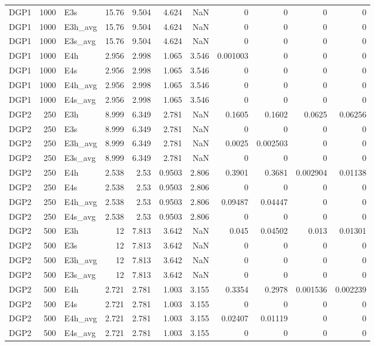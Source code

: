 \begin{table}[!htbp]
\begin{tabular}{lrlrrrrrrrr}
DGP1 & 1000 & E3s & 15.76 & 9.504 & 4.624 & NaN & 0 & 0 & 0 & 0 \\
DGP1 & 1000 & E3h_avg & 15.76 & 9.504 & 4.624 & NaN & 0 & 0 & 0 & 0 \\
DGP1 & 1000 & E3s_avg & 15.76 & 9.504 & 4.624 & NaN & 0 & 0 & 0 & 0 \\
DGP1 & 1000 & E4h & 2.956 & 2.998 & 1.065 & 3.546 & 0.001003 & 0 & 0 & 0 \\
DGP1 & 1000 & E4s & 2.956 & 2.998 & 1.065 & 3.546 & 0 & 0 & 0 & 0 \\
DGP1 & 1000 & E4h_avg & 2.956 & 2.998 & 1.065 & 3.546 & 0 & 0 & 0 & 0 \\
DGP1 & 1000 & E4s_avg & 2.956 & 2.998 & 1.065 & 3.546 & 0 & 0 & 0 & 0 \\
DGP2 & 250 & E3h & 8.999 & 6.349 & 2.781 & NaN & 0.1605 & 0.1602 & 0.0625 & 0.06256 \\
DGP2 & 250 & E3s & 8.999 & 6.349 & 2.781 & NaN & 0 & 0 & 0 & 0 \\
DGP2 & 250 & E3h_avg & 8.999 & 6.349 & 2.781 & NaN & 0.0025 & 0.002503 & 0 & 0 \\
DGP2 & 250 & E3s_avg & 8.999 & 6.349 & 2.781 & NaN & 0 & 0 & 0 & 0 \\
DGP2 & 250 & E4h & 2.538 & 2.53 & 0.9503 & 2.806 & 0.3901 & 0.3681 & 0.002904 & 0.01138 \\
DGP2 & 250 & E4s & 2.538 & 2.53 & 0.9503 & 2.806 & 0 & 0 & 0 & 0 \\
DGP2 & 250 & E4h_avg & 2.538 & 2.53 & 0.9503 & 2.806 & 0.09487 & 0.04447 & 0 & 0 \\
DGP2 & 250 & E4s_avg & 2.538 & 2.53 & 0.9503 & 2.806 & 0 & 0 & 0 & 0 \\
DGP2 & 500 & E3h & 12 & 7.813 & 3.642 & NaN & 0.045 & 0.04502 & 0.013 & 0.01301 \\
DGP2 & 500 & E3s & 12 & 7.813 & 3.642 & NaN & 0 & 0 & 0 & 0 \\
DGP2 & 500 & E3h_avg & 12 & 7.813 & 3.642 & NaN & 0 & 0 & 0 & 0 \\
DGP2 & 500 & E3s_avg & 12 & 7.813 & 3.642 & NaN & 0 & 0 & 0 & 0 \\
DGP2 & 500 & E4h & 2.721 & 2.781 & 1.003 & 3.155 & 0.3354 & 0.2978 & 0.001536 & 0.002239 \\
DGP2 & 500 & E4s & 2.721 & 2.781 & 1.003 & 3.155 & 0 & 0 & 0 & 0 \\
DGP2 & 500 & E4h_avg & 2.721 & 2.781 & 1.003 & 3.155 & 0.02407 & 0.01119 & 0 & 0 \\
DGP2 & 500 & E4s_avg & 2.721 & 2.781 & 1.003 & 3.155 & 0 & 0 & 0 & 0 \\

\end{tabular}
\end{table}
